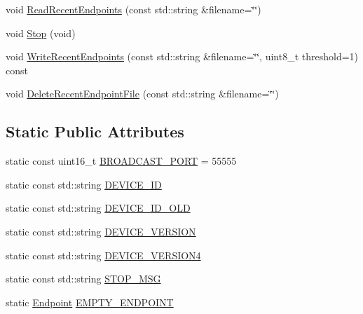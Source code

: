 \begin{DoxyCompactItemize}
void \hyperlink{class_wy_light_1_1_broadcast_receiver_a33985105c1c905bf01ec5012c825878e}{Read\-Recent\-Endpoints} (const std\-::string \&filename=\char`\"{}\char`\"{})
\item 
void \hyperlink{class_wy_light_1_1_broadcast_receiver_a018a961883af11174f0bc36695bb222c}{Stop} (void)
\item 
void \hyperlink{class_wy_light_1_1_broadcast_receiver_a54367ab857356899e0c5263b856e2d60}{Write\-Recent\-Endpoints} (const std\-::string \&filename=\char`\"{}\char`\"{}, uint8\-\_\-t threshold=1) const 
\item 
void \hyperlink{class_wy_light_1_1_broadcast_receiver_a47dfbc4ae76f027dc8a4c07898eb3bda}{Delete\-Recent\-Endpoint\-File} (const std\-::string \&filename=\char`\"{}\char`\"{})
\end{DoxyCompactItemize}
\subsection*{Static Public Attributes}
\begin{DoxyCompactItemize}
\item 
static const uint16\-\_\-t \hyperlink{class_wy_light_1_1_broadcast_receiver_a7cdb8d26a95a50b32317bb8332668f9f}{B\-R\-O\-A\-D\-C\-A\-S\-T\-\_\-\-P\-O\-R\-T} = 55555
\item 
static const std\-::string \hyperlink{class_wy_light_1_1_broadcast_receiver_a2beb5ad6ccb439295e8909469ce1d9ff}{D\-E\-V\-I\-C\-E\-\_\-\-I\-D}
\item 
static const std\-::string \hyperlink{class_wy_light_1_1_broadcast_receiver_ae6b56fcc57286f0132d6fbe19e59599d}{D\-E\-V\-I\-C\-E\-\_\-\-I\-D\-\_\-\-O\-L\-D}
\item 
static const std\-::string \hyperlink{class_wy_light_1_1_broadcast_receiver_a066987115c69911571021470e07b524e}{D\-E\-V\-I\-C\-E\-\_\-\-V\-E\-R\-S\-I\-O\-N}
\item 
static const std\-::string \hyperlink{class_wy_light_1_1_broadcast_receiver_a2c833aa8d9d1b56b92f1d17c96371be8}{D\-E\-V\-I\-C\-E\-\_\-\-V\-E\-R\-S\-I\-O\-N4}
\item 
static const std\-::string \hyperlink{class_wy_light_1_1_broadcast_receiver_a7e3c3f4fe453f48d012ecbb15e8cb5e5}{S\-T\-O\-P\-\_\-\-M\-S\-G}
\item 
static \hyperlink{class_wy_light_1_1_endpoint}{Endpoint} \hyperlink{class_wy_light_1_1_broadcast_receiver_a3028b6394222f327c1286e9263a126a7}{E\-M\-P\-T\-Y\-\_\-\-E\-N\-D\-P\-O\-I\-N\-T}
\end{DoxyCompactItemize}


